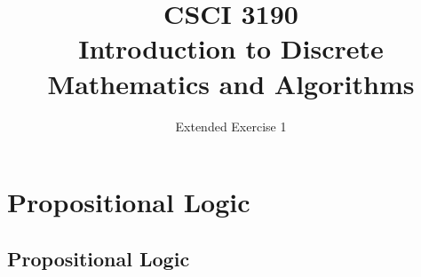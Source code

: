 \documentclass{sig-alternate-05-2015}
\begin{document}






%

\title{CSCI 3190 \\ Introduction to Discrete Mathematics and Algorithms}
\subtitle{Extended Exercise 1}

\maketitle
\begin{abstract}

\end{abstract}

\keywords{}

\section{Propositional Logic}
\subsection{Propositional Logic}
\end{document}
